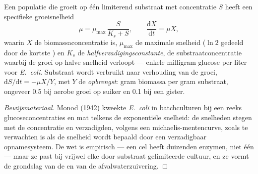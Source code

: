 \begin{theorem}\label{thm:b2:microbial-metabolism:monod}
Een populatie die groeit op één limiterend substraat met concentratie
$S$ heeft een specifieke groeisnelheid
\[
\mu = \mu_{\max}\,\frac{S}{K_s + S}, \qquad \frac{\mathrm{d}X}{\mathrm{d}t} = \mu X,
\]
waarin $X$ de biomassaconcentratie is, $\mu_{\max}$ de maximale
snelheid ($\ln 2$ gedeeld door de kortste ) en $K_s$ de
\emph{halfverzadigingsconstante}, de substraatconcentratie waarbij de
groei op halve snelheid verloopt --- enkele milligram glucose per liter
voor \emph{E.~coli}. Substraat wordt verbruikt naar verhouding van de
groei, $\mathrm{d}S/\mathrm{d}t =
-\mu X/Y$, met $Y$ de \emph{opbrengst}: gram biomassa per gram
substraat, ongeveer \num{0.5} bij aerobe groei op suiker en \num{0.1}
bij een gister.
\end{theorem}
\begin{proof}[Bewijsmateriaal]
Monod (1942) kweekte \emph{E.~coli} in batchculturen bij een reeks
glucoseconcentraties en mat telkens de exponentiële snelheid: de
snelheden stegen met de concentratie en verzadigden, volgens een
michaelis-mentencurve, zoals te verwachten is als de snelheid wordt
bepaald door een verzadigbaar opnamesysteem. De wet is empirisch --- een
cel heeft duizenden enzymen, niet één --- maar ze past bij vrijwel elke
door substraat gelimiteerde cultuur, en ze vormt de grondslag van de
 en van de afvalwaterzuivering.
\end{proof}

